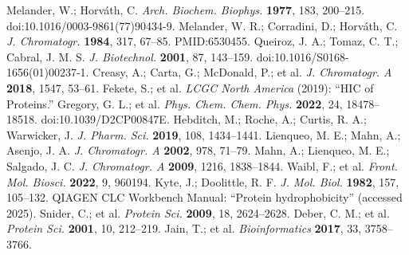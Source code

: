 \documentclass[11pt]{article}
\begin{document}
\begin{thebibliography}{99}\small
{} Melander, W.; Horváth, C. \emph{Arch. Biochem. Biophys.} \textbf{1977}, 183, 200–215. doi:10.1016/0003-9861(77)90434-9.
 Melander, W. R.; Corradini, D.; Horváth, C. \emph{J. Chromatogr.} \textbf{1984}, 317, 67–85. PMID:6530455.
 Queiroz, J. A.; Tomaz, C. T.; Cabral, J. M. S. \emph{J. Biotechnol.} \textbf{2001}, 87, 143–159. doi:10.1016/S0168-1656(01)00237-1.
 Creasy, A.; Carta, G.; McDonald, P.; et al. \emph{J. Chromatogr. A} \textbf{2018}, 1547, 53–61.
 Fekete, S.; et al. \emph{LCGC North America} (2019): ``HIC of Proteins.'' 
 Gregory, G. L.; et al. \emph{Phys. Chem. Chem. Phys.} \textbf{2022}, 24, 18478–18518. doi:10.1039/D2CP00847E.
 Hebditch, M.; Roche, A.; Curtis, R. A.; Warwicker, J. \emph{J. Pharm. Sci.} \textbf{2019}, 108, 1434–1441.
 Lienqueo, M. E.; Mahn, A.; Asenjo, J. A. \emph{J. Chromatogr. A} \textbf{2002}, 978, 71–79.
 Mahn, A.; Lienqueo, M. E.; Salgado, J. C. \emph{J. Chromatogr. A} \textbf{2009}, 1216, 1838–1844.
 Waibl, F.; et al. \emph{Front. Mol. Biosci.} \textbf{2022}, 9, 960194.
 Kyte, J.; Doolittle, R. F. \emph{J. Mol. Biol.} \textbf{1982}, 157, 105–132.
 QIAGEN CLC Workbench Manual: ``Protein hydrophobicity'' (accessed 2025).
 Snider, C.; et al. \emph{Protein Sci.} \textbf{2009}, 18, 2624–2628. %
 Deber, C. M.; et al. \emph{Protein Sci.} \textbf{2001}, 10, 212–219.
 Jain, T.; et al. \emph{Bioinformatics} \textbf{2017}, 33, 3758–3766.
\end{thebibliography}
\end{document}
